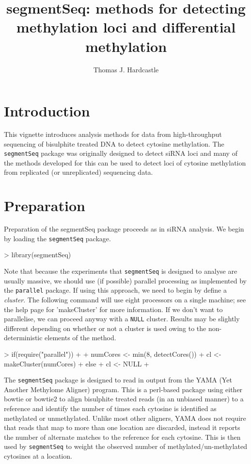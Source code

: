 \documentclass[a4paper]{article}
\title{segmentSeq: methods for detecting methylation loci and differential methylation}
\author{Thomas J. Hardcastle}
\begin{document}
\maketitle

\section{Introduction}

This vignette introduces analysis methods for data from high-throughput sequencing of bisulphite treated DNA to detect cytosine methylation. The \verb'segmentSeq' package was originally designed to detect siRNA loci \cite{Hardcastle:2011} and many of the methods developed for this can be used to detect loci of cytosine methylation from replicated (or unreplicated) sequencing data.

\section{Preparation}

Preparation of the segmentSeq package proceeds as in siRNA analysis. We begin by loading the \verb'segmentSeq' package.

\begin{Schunk}
\begin{Sinput}
>   library(segmentSeq)
\end{Sinput}
\end{Schunk}

Note that because the experiments that \verb'segmentSeq' is designed to analyse are usually massive, we should use (if possible) parallel processing as implemented by the \verb'parallel' package. If using this approach, we need to begin by define a \textsl{cluster}. The following command will use eight processors on a single machine; see the help page for 'makeCluster' for more information. If we don't want to parallelise, we can proceed anyway with a \verb'NULL' cluster. Results may be slightly different depending on whether or not a cluster is used owing to the non-deterministic elements of the method.

\begin{Schunk}
\begin{Sinput}
> if(require("parallel")) 
+ {
+     numCores <- min(8, detectCores())
+     cl <- makeCluster(numCores)
+ } else {
+     cl <- NULL
+ }
\end{Sinput}
\end{Schunk}

The \verb'segmentSeq' package is designed to read in output from the YAMA (Yet Another Methylome Aligner) program. This is a perl-based package using either bowtie or bowtie2 to align bisulphite treated reads (in an unbiased manner) to a reference and identify the number of times each cytosine is identified as methylated or unmethylated. Unlike most other aligners, YAMA does not require that reads that map to more than one location are discarded, instead it reports the number of alternate matches to the reference for each cytosine. This is then used by \verb'segmentSeq' to weight the observed number of methylated/un-methylated cytosines at a location.
\end{document}

